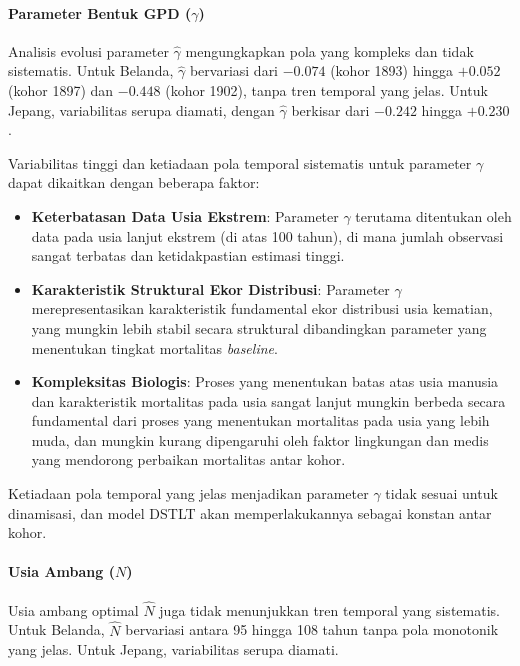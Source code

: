 \paragraph{Parameter Bentuk GPD ($\gamma$)}
Analisis evolusi parameter $\hat{\gamma}$ mengungkapkan pola yang kompleks dan tidak sistematis. Untuk Belanda, $\hat{\gamma}$ bervariasi dari $-0.074$ (kohor 1893) hingga $+0.052$ (kohor 1897) dan $-0.448$ (kohor 1902), tanpa tren temporal yang jelas. Untuk Jepang, variabilitas serupa diamati, dengan $\hat{\gamma}$ berkisar dari $-0.242$ hingga $+0.230$.

Variabilitas tinggi dan ketiadaan pola temporal sistematis untuk parameter $\gamma$ dapat dikaitkan dengan beberapa faktor:
\begin{itemize}
    \item \textbf{Keterbatasan Data Usia Ekstrem}: Parameter $\gamma$ terutama ditentukan oleh data pada usia lanjut ekstrem (di atas 100 tahun), di mana jumlah observasi sangat terbatas dan ketidakpastian estimasi tinggi.
    
    \item \textbf{Karakteristik Struktural Ekor Distribusi}: Parameter $\gamma$ merepresentasikan karakteristik fundamental ekor distribusi usia kematian, yang mungkin lebih stabil secara struktural dibandingkan parameter yang menentukan tingkat mortalitas \textit{baseline}.
    
    \item \textbf{Kompleksitas Biologis}: Proses yang menentukan batas atas usia manusia dan karakteristik mortalitas pada usia sangat lanjut mungkin berbeda secara fundamental dari proses yang menentukan mortalitas pada usia yang lebih muda, dan mungkin kurang dipengaruhi oleh faktor lingkungan dan medis yang mendorong perbaikan mortalitas antar kohor.
\end{itemize}

Ketiadaan pola temporal yang jelas menjadikan parameter $\gamma$ tidak sesuai untuk dinamisasi, dan model DSTLT akan memperlakukannya sebagai konstan antar kohor.

\paragraph{Usia Ambang ($N$)}
Usia ambang optimal $\hat{N}$ juga tidak menunjukkan tren temporal yang sistematis. Untuk Belanda, $\hat{N}$ bervariasi antara 95 hingga 108 tahun tanpa pola monotonik yang jelas. Untuk Jepang, variabilitas serupa diamati.

